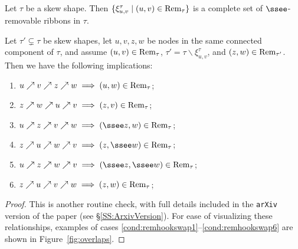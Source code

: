 \begin{lemma}\label{xiuv}
Let \(\tau\) be a skew shape. Then \(\{ \xi^\tau_{u,v} \mid (u,v) \in \textup{Rem}_\tau\}\) is a complete set of \(\ssee\)-removable ribbons in \(\tau\).
\end{lemma}


 \begin{lemma}\label{remhookswap}
Let \(\tau' \subsetneq \tau\) be skew shapes, let \(u,v,z,w\) be nodes in the same connected component of \(\tau\), and assume \((u,v) \in \textup{Rem}_\tau\), \(\tau' = \tau \backslash \xi^{\tau}_{u,v}\), and \((z,w) \in \textup{Rem}_{\tau'}\). Then we have the following implications:
\begin{enumerate}
\item \(u \nearrow v \nearrow z \nearrow w \implies (u,w) \in \textup{Rem}_{\tau}\); \label{cond:remhookswap1}
\item \(z \nearrow w \nearrow u \nearrow v \implies (z,v) \in \textup{Rem}_\tau\); \label{cond:remhookswap2}
\item \(u \nearrow z \nearrow v \nearrow w \implies (\ssee z, w) \in \textup{Rem}_{\tau}\); \label{cond:remhookswap3}
\item \(z \nearrow u \nearrow w \nearrow v \implies (z, \ssee w) \in \textup{Rem}_{\tau}\); \label{cond:remhookswap4}
\item \(u \nearrow z \nearrow w \nearrow v \implies (\ssee z, \ssee w) \in \textup{Rem}_\tau\); \label{cond:remhookswap5}
\item \(z \nearrow u \nearrow v \nearrow w \implies (z,w) \in \textup{Rem}_\tau\); \label{cond:remhookswap6}
\end{enumerate}
 \end{lemma}
 \begin{proof}
  This is another routine check, with full details included in the \texttt{arXiv} version of the paper (see \S\ref{SS:ArxivVersion}). 
For ease of visualizing these relationships, examples of cases \eqref{cond:remhookswap1}--\eqref{cond:remhookswap6} are shown in Figure~\ref{fig:overlaps}.
\end{proof}


